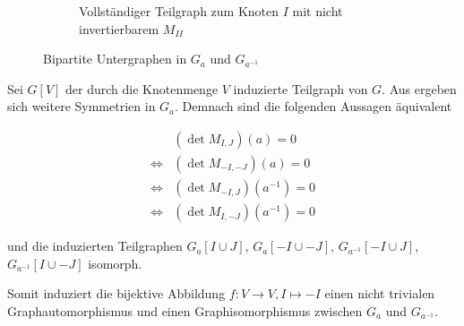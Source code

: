 \begin{figure}[]
\begin{subfigure}[b]{0.47\textwidth}
        \caption{Vollständiger Teilgraph zum Knoten $I$ mit nicht invertierbarem $M_{II}$}
        \label{fig:complete-graph}
    \end{subfigure}
    \caption{Bipartite Untergraphen in $G_a$ und $G_{a^{-1}}$}
    \label{fig:subgraphs}
\end{figure}

Sei $G[V]$ der durch die Knotenmenge $V$ induzierte Teilgraph von $G$. Aus  ergeben sich weitere Symmetrien in $G_a$. Demnach sind die folgenden Aussagen äquivalent

\begin{align*}
    &(\det{} M_{I,J})(a) = 0 \\
    \iff &(\det{} M_{-I,-J})(a) = 0 \\
    \iff &(\det{} M_{-I,J})(a^{-1}) = 0 \\
    \iff &(\det{} M_{I,-J})(a^{-1}) = 0
\end{align*}


und die induzierten Teilgraphen $G_a[I \cup J]$, $G_a[-I \cup -J]$, $G_{a^{-1}}[-I \cup J]$, $G_{a^{-1}}[I \cup -J]$ isomorph.

Somit induziert die bijektive Abbildung $f:V \to V, I \mapsto -I$ einen nicht trivialen Graphautomorphismus und einen Graphisomorphismus zwischen $G_a$ und $G_{a^{-1}}$.